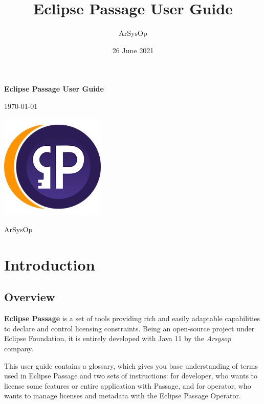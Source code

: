 \documentclass[12pt]{report}
\title{Eclipse Passage User Guide}
\author{ArSysOp}
\date{26 June 2021}
\begin{document}
\begin{titlepage}
    \begin{center}
        \vspace*{1cm}

        \Huge
        \textbf{Eclipse Passage User Guide}

        \vspace{0.5cm}

        \Large
        \today

        \vfill

        \includegraphics[width=5cm]{passage}

        \vfill

        \Large
        ArSysOp
    \end{center}
\end{titlepage}

\tableofcontents

\chapter*{Introduction}

\section*{Overview}

\textbf{Eclipse Passage} is a set of tools providing rich and easily adaptable capabilities to declare and control licensing constraints.
Being an open-source project under Eclipse Foundation, it is entirely developed with Java 11 by the \textit{Arsysop} company.

This user guide contains a glossary, which gives you base understanding of terms used in Eclipse Passage and two sets of instructions: for developer, who
wants to license some features or entire application with Passage, and for operator, who wants to manage licenses and metadata with the Eclipse Passage Operator.
\end{document}
